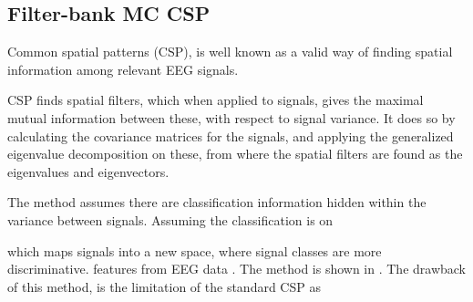 \subsection{Filter-bank MC CSP}
Common spatial patterns (CSP), is well known as a valid way of finding spatial information among  relevant EEG signals. 


CSP finds spatial filters, which when applied to signals, gives the maximal mutual information between these, with respect to signal variance. It does so by calculating the covariance matrices for the signals, and applying the generalized eigenvalue decomposition on these, from where the spatial filters are found as the eigenvalues and eigenvectors.

The method assumes there are classification information hidden within the variance between signals. Assuming the classification is on \cite{blankertz2008optimizing}

which maps signals into a new space, where signal classes are more discriminative.  features from EEG data . The method is shown in .  The drawback of this method, is the limitation of the standard CSP as 


